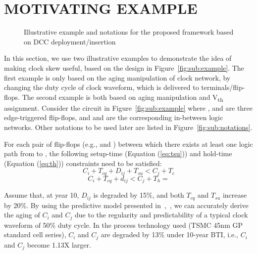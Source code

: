 \section{MOTIVATING EXAMPLE}
\label{sec:motivate}
\begin{figure*}[!ht]
    \centering
    \hspace{1.6cm}
    \caption{Illustrative example and notations for the proposed framework based on DCC deployment/insertion}
    \label{fig:en}
\end{figure*}

In this section, we use two illustrative examples to demonstrate the idea of making clock skew useful, based on the design in Figure~\ref{fig:sub:example}. The first example is only based on the aging manipulation of clock network, by changing the duty cycle of clock waveform, which is delivered to terminals/flip-flops. The second example is both based on aging manipulation and V\textsubscript{th} assignment. Consider the circuit in Figure~\ref{fig:sub:example} where ,  and  are three edge-triggered flip-flops, and  and  are the corresponding in-between logic networks. Other notations to be used later are listed in Figure~\ref{fig:sub:notations}.

For each pair of flip-flops (e.g.,  and ) between which there exists at least one logic path from  to , the following setup-time (Equation (\ref{eq:tsu})) and hold-time (Equation (\ref{eq:th})) constraints need to be satisfied:
\begin{equation}
C_i+T_{cq}+D_{ij}+T_{su}<C_j+T_c
\label{eq:tsu}
\end{equation}
\begin{equation}
C_i+T_{cq}+d_{ij}<C_j+T_h
\label{eq:th}=
\end{equation}

Assume that, at year 10, $D_{ij}$ is degraded by 15\%, and both $T_{cq}$ and $T_{su}$ increase by 20\%. By using the predictive model presented in~\cite{wang2010impact},~\cite{wang2007efficient}, we can accurately derive the aging of $C_i$ and $C_j$ due to the regularity and predictability of a typical clock waveform of 50\% duty cycle. In the process technology used (TSMC 45nm GP standard cell series), $C_i$ and $C_j$ are degraded by 13\% under 10-year BTI, i.e., $C_i$ and $C_j$ become 1.13X larger.

